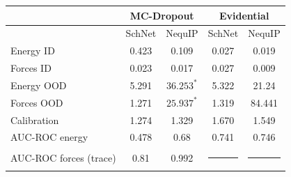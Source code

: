 \begin{tabular}{lcccc}
\toprule
 & \multicolumn{2}{c}{MC-Dropout} & \multicolumn{2}{c}{Evidential}  \\
\midrule
 & SchNet & NequIP  & SchNet & NequIP \\
 \midrule
Energy ID    & 0.423 & 0.109  & 0.027 & 0.019 \\
Forces ID    & 0.023 & 0.017  & 0.027 & 0.009 \\
Energy OOD   & 5.291 & $36.253^{*}$  & 5.322 & 21.24 \\
Forces OOD  & 1.271 & $25.937^{*}$  & 1.319 & 84.441 \\
\midrule
Calibration  & 1.274 & 1.329  & 1.670 & 1.549 \\
 \midrule
AUC-ROC energy    & 0.478 & 0.68  & 0.741 & 0.746\\
AUC-ROC forces (trace)    & 0.81 & 0.992  & \noindent\rule{0.8cm}{0.6pt} & \noindent\rule{0.8cm}{0.6pt}\\
\bottomrule
\end{tabular}